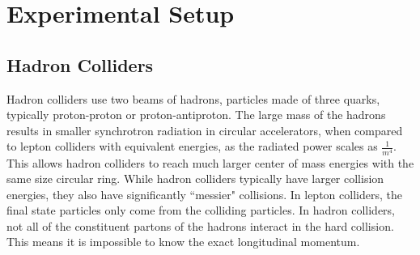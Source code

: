 \chapter{Experimental Setup}
\label{chap:exp}
\section{Hadron Colliders}
Hadron colliders use two beams of hadrons, particles made of three quarks, typically proton-proton or proton-antiproton. The large mass of the hadrons results in smaller synchrotron radiation in circular accelerators, when compared to lepton colliders with equivalent energies, as the radiated power scales as ${\frac{1}{m^{4}}}$. This allows hadron colliders to reach much larger center of mass energies with the same size circular ring. \newline
\indent While hadron colliders typically have larger collision energies, they also have significantly ``messier" collisions. In lepton colliders, the final state particles only come from the colliding particles. In hadron colliders, not all of the constituent partons of the hadrons interact in the hard collision. This means it is impossible to know the exact longitudinal momentum.




